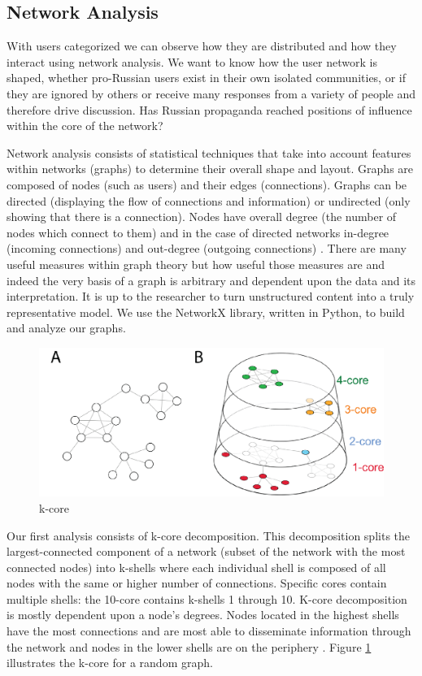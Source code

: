 \subsection{Network Analysis}

With users categorized we can observe how they are distributed and how they interact using network analysis.
We want to know how the user network is shaped, whether pro-Russian users exist in their own isolated communities, or if they are ignored by others or receive many responses from a variety of people and therefore drive discussion.
Has Russian propaganda reached positions of influence within the core of the network?

Network analysis consists of statistical techniques that take into account features within networks (graphs) to determine their overall shape and layout. Graphs are composed of nodes (such as users) and their edges (connections). Graphs can be directed (displaying the flow of connections and information) or undirected (only showing that there is a connection).
Nodes have overall degree (the number of nodes which connect to them) and in the case of directed networks in-degree (incoming connections) and out-degree (outgoing connections) \cite[pp. 199-200]{woolley2018}.
There are many useful measures within graph theory but how useful those measures are and indeed the very basis of a graph is arbitrary and dependent upon the data and its interpretation.
It is up to the researcher to turn unstructured content into a truly representative model.
We use the NetworkX library, written in Python, to build and analyze our graphs.

\begin{figure}[!ht]
\centering
\includegraphics[width=\textwidth]{rus/kcore}
\caption{k-core \cite{barbera2015}}
\label{fig:kcore}
\end{figure}

Our first analysis consists of k-core decomposition.
This decomposition splits the largest-connected component of a network (subset of the network with the most connected nodes) into k-shells where each individual shell is composed of all nodes with the same or higher number of connections.
Specific cores contain multiple shells: the 10-core contains k-shells 1 through 10.
K-core decomposition is mostly dependent upon a node's degrees.
Nodes located in the highest shells have the most connections and are most able to disseminate information through the network and nodes in the lower shells are on the periphery \cite[p. 200]{woolley2018}.
Figure \ref{fig:kcore} illustrates the k-core for a random graph.

